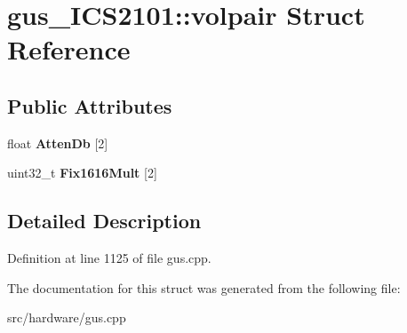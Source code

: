 \hypertarget{structgus__ICS2101_1_1volpair}{\section{gus\-\_\-\-I\-C\-S2101\-:\-:volpair Struct Reference}
\label{structgus__ICS2101_1_1volpair}
}
\subsection*{Public Attributes}
\begin{DoxyCompactItemize}
\item 
\hypertarget{structgus__ICS2101_1_1volpair_a02314a3a3ad17a789bc194f027a55728}{float {\bfseries Atten\-Db} \mbox{[}2\mbox{]}}\label{structgus__ICS2101_1_1volpair_a02314a3a3ad17a789bc194f027a55728}

\item 
\hypertarget{structgus__ICS2101_1_1volpair_a46cbc4d1df89d680f55e3bc2ab41baca}{uint32\-\_\-t {\bfseries Fix1616\-Mult} \mbox{[}2\mbox{]}}\label{structgus__ICS2101_1_1volpair_a46cbc4d1df89d680f55e3bc2ab41baca}

\end{DoxyCompactItemize}


\subsection{Detailed Description}


Definition at line 1125 of file gus.\-cpp.



The documentation for this struct was generated from the following file\-:\begin{DoxyCompactItemize}
\item 
src/hardware/gus.\-cpp\end{DoxyCompactItemize}
